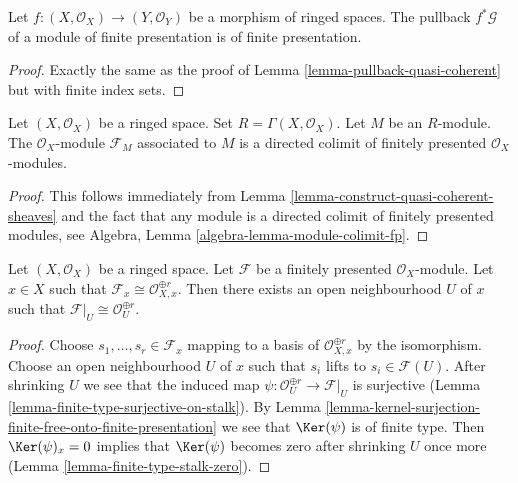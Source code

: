\begin{lemma}
\label{lemma-pullback-finite-presentation}
Let $f : (X, \mathcal{O}_X) \to (Y, \mathcal{O}_Y)$
be a morphism of ringed spaces.
The pullback $f^*\mathcal{G}$ of a module of finite presentation
is of finite presentation.
\end{lemma}

\begin{proof}
Exactly the same as the proof of Lemma \ref{lemma-pullback-quasi-coherent}
but with finite index sets.
\end{proof}

\begin{lemma}
\label{lemma-quasi-coherent-limit-finite-presentation}
Let $(X, \mathcal{O}_X)$ be a ringed space.
Set $R = \Gamma(X, \mathcal{O}_X)$.
Let $M$ be an $R$-module.
The $\mathcal{O}_X$-module $\mathcal{F}_M$ associated to $M$
is a directed colimit of finitely presented $\mathcal{O}_X$-modules.
\end{lemma}

\begin{proof}
This follows immediately from
Lemma \ref{lemma-construct-quasi-coherent-sheaves}
and the fact that any module is a directed colimit
of finitely presented modules, see
Algebra, Lemma \ref{algebra-lemma-module-colimit-fp}.
\end{proof}

\begin{lemma}
\label{lemma-finite-presentation-stalk-free}
Let $(X, \mathcal{O}_X)$ be a ringed space. Let $\mathcal{F}$ be
a finitely presented $\mathcal{O}_X$-module. Let $x \in X$ such that
$\mathcal{F}_x \cong \mathcal{O}_{X, x}^{\oplus r}$. Then there exists
an open neighbourhood $U$ of $x$ such that
$\mathcal{F}|_U \cong \mathcal{O}_U^{\oplus r}$.
\end{lemma}

\begin{proof}
Choose $s_1, \ldots, s_r \in \mathcal{F}_x$ mapping to a basis of
$\mathcal{O}_{X, x}^{\oplus r}$ by the isomorphism. Choose an open
neighbourhood $U$ of $x$ such that $s_i$ lifts to $s_i \in \mathcal{F}(U)$.
After shrinking $U$ we see that the induced map
$\psi : \mathcal{O}_U^{\oplus r} \to \mathcal{F}|_U$ is surjective
(Lemma \ref{lemma-finite-type-surjective-on-stalk}).
By Lemma \ref{lemma-kernel-surjection-finite-free-onto-finite-presentation}
we see that $\Ker(\psi)$ is of finite type.
Then $\Ker(\psi)_x = 0$ implies that $\Ker(\psi)$ becomes zero
after shrinking $U$ once more (Lemma \ref{lemma-finite-type-stalk-zero}).
\end{proof}





